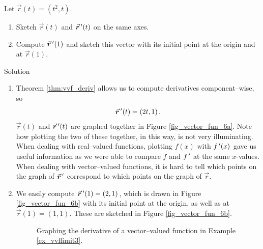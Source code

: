 \begin{example}\label{ex_vvflimit3}
Let $\vec r(t) = \left( t^2,t\right)$. 
\begin{enumerate}
	\item Sketch $\vec r(t)$ and $\vrp(t)$ on the same axes.
	\item	Compute $\vrp(1)$ and sketch this vector with its initial point at the origin and at $\vec r(1)$.
\end{enumerate}

Solution 


\begin{enumerate}
\item	Theorem \ref{thm:vvf_deriv} allows us to compute derivatives component--wise, so
$$\vrp(t) = \left( 2t, 1\right).$$ $\vec r(t)$ and $\vrp(t)$ are graphed together in Figure \ref{fig_vector_fun_6a}. Note how plotting the two of these together, in this way, is not very illuminating. When dealing with real--valued functions, plotting $f(x)$ with $f\,'(x)$ gave us useful information as we were able to compare $f$ and $f\,'$ at the same $x$-values. When dealing with vector--valued functions, it is hard to tell which points on the graph of $\vrp$ correspond to which points on the graph of $\vec r$.

\item	We easily compute $\vrp(1) = \left( 2,1\right)$, which is drawn in Figure \ref{fig_vector_fun_6b} with its initial point at the origin, as well as at $\vec r(1) = \left( 1,1\right).$ These are sketched in Figure \ref{fig_vector_fun_6b}.


\begin{figure}[H]
\centering
\centerline{
\hspace{0.1cm}
}
\caption{Graphing the derivative of a vector--valued function in Example \ref{ex_vvflimit3}.}
\end{figure}


\end{enumerate}
\end{example}

